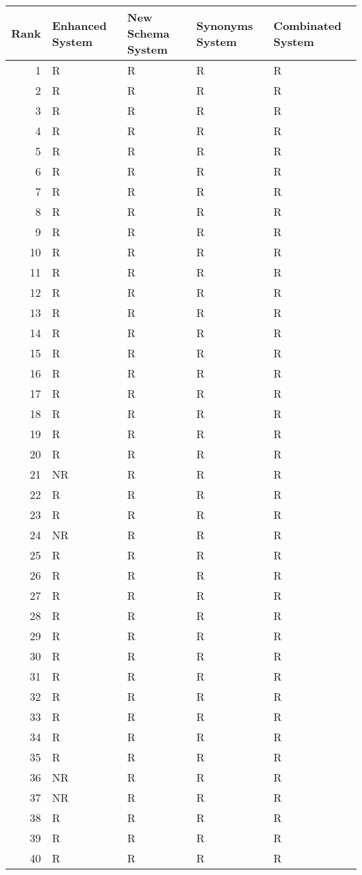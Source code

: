 \begin{tabular}{rllll}
\toprule
Rank & Enhanced System & New Schema System & Synonyms System & Combinated System \\
\midrule
1 & R & R & R & R \\
2 & R & R & R & R \\
3 & R & R & R & R \\
4 & R & R & R & R \\
5 & R & R & R & R \\
6 & R & R & R & R \\
7 & R & R & R & R \\
8 & R & R & R & R \\
9 & R & R & R & R \\
10 & R & R & R & R \\
11 & R & R & R & R \\
12 & R & R & R & R \\
13 & R & R & R & R \\
14 & R & R & R & R \\
15 & R & R & R & R \\
16 & R & R & R & R \\
17 & R & R & R & R \\
18 & R & R & R & R \\
19 & R & R & R & R \\
20 & R & R & R & R \\
21 & NR & R & R & R \\
22 & R & R & R & R \\
23 & R & R & R & R \\
24 & NR & R & R & R \\
25 & R & R & R & R \\
26 & R & R & R & R \\
27 & R & R & R & R \\
28 & R & R & R & R \\
29 & R & R & R & R \\
30 & R & R & R & R \\
31 & R & R & R & R \\
32 & R & R & R & R \\
33 & R & R & R & R \\
34 & R & R & R & R \\
35 & R & R & R & R \\
36 & NR & R & R & R \\
37 & NR & R & R & R \\
38 & R & R & R & R \\
39 & R & R & R & R \\
40 & R & R & R & R \\
\bottomrule
\end{tabular}
